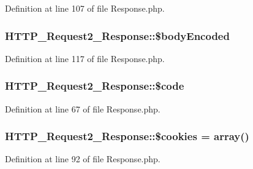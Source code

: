 Definition at line 107 of file Response.\-php.

\hypertarget{classHTTP__Request2__Response_a1ab2bec927b0ac3d7cf82888479a4fea}{
\subsubsection[{\$body\-Encoded}]{\setlength{\rightskip}{0pt plus 5cm}H\-T\-T\-P\-\_\-\-Request2\-\_\-\-Response\-::\$body\-Encoded\hspace{0.3cm}{\ttfamily [protected]}}}\label{classHTTP__Request2__Response_a1ab2bec927b0ac3d7cf82888479a4fea}


Definition at line 117 of file Response.\-php.

\hypertarget{classHTTP__Request2__Response_a974eeb592b307dca6c7d02e0311832f5}{
\subsubsection[{\$code}]{\setlength{\rightskip}{0pt plus 5cm}H\-T\-T\-P\-\_\-\-Request2\-\_\-\-Response\-::\$code\hspace{0.3cm}{\ttfamily [protected]}}}\label{classHTTP__Request2__Response_a974eeb592b307dca6c7d02e0311832f5}


Definition at line 67 of file Response.\-php.

\hypertarget{classHTTP__Request2__Response_af1d49532aaf677e27046fafff4f5e985}{
\subsubsection[{\$cookies}]{\setlength{\rightskip}{0pt plus 5cm}H\-T\-T\-P\-\_\-\-Request2\-\_\-\-Response\-::\$cookies = array()\hspace{0.3cm}{\ttfamily [protected]}}}\label{classHTTP__Request2__Response_af1d49532aaf677e27046fafff4f5e985}


Definition at line 92 of file Response.\-php.

